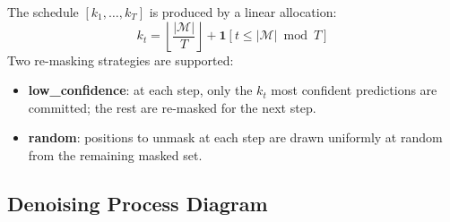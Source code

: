 \documentclass[11pt,a4paper]{article}
\begin{document}
\medskip
The schedule $[k_1, \ldots, k_T]$ is produced by a linear allocation:
\[
  k_t = \left\lfloor \frac{|\mathcal{M}|}{T} \right\rfloor + \mathbf{1}[t \leq |\mathcal{M}| \bmod T]
\]
Two re-masking strategies are supported:
\begin{itemize}[noitemsep]
  \item \textbf{low\_confidence}: at each step, only the $k_t$ most confident predictions are committed; the rest are re-masked for the next step.
  \item \textbf{random}: positions to unmask at each step are drawn uniformly at random from the remaining masked set.
\end{itemize}

\subsection{Denoising Process Diagram}
\end{document}

